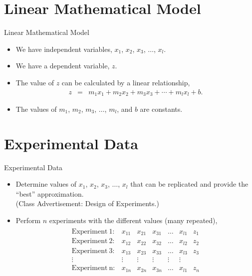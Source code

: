 \documentclass[svgnames,table,,aspectratio=169]{beamer}
\begin{document}
\section{Linear Mathematical Model}

\begin{frame}{Linear Mathematical Model}

  \begin{itemize}
  \item We have independent variables, $x_1$, $x_2$, $x_3$, $\ldots$,
    $x_l$.
  \item We have a dependent variable, $z$.
  \item The value of $z$ can be calculated by a linear relationship,
    \begin{eqnarray*}
      z & = & m_1 x_1 + m_2 x_2 + m_3 x_3 + \cdots + m_l x_l + b.
    \end{eqnarray*}
  \item The values of $m_1$, $m_2$, $m_3$, $\ldots$, $m_l$, and $b$  are constants.
  \end{itemize}

  \vfill


  \vfill

\end{frame}

\section{Experimental Data}

\begin{frame}{Experimental Data}

  \begin{itemize}
  \item Determine values of $x_1$, $x_2$, $x_3$, $\ldots$, $x_l$ that
    can be replicated and provide the ``best'' approximation. \\
    (Class Advertisement: Design of Experiments.)
  \item Perform $n$ experiments with the different values (many
    repeated),
    \begin{eqnarray*}
      \begin{array}{lr|r|r|r|r|r}
        \mathrm{Experiment~1}: & x_{11}  & x_{21} & x_{31} & \ldots & x_{l1} & z_1 \\
        \mathrm{Experiment~2}: & x_{12}  & x_{22} & x_{32} & \ldots & x_{l2} & z_2 \\
        \mathrm{Experiment~3}: & x_{13}  & x_{23} & x_{33} & \ldots & x_{l3} & z_3 \\
        \vdots & \vdots & \vdots & \vdots & \vdots & \vdots \\
        \mathrm{Experiment~n}: & x_{1n}  & x_{2n} & x_{3n} & \ldots & x_{l1} & z_n 
      \end{array}
    \end{eqnarray*}
  \end{itemize}
  
\end{frame}
\end{document}
